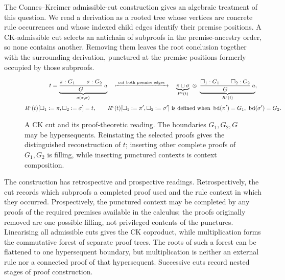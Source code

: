 \documentclass[10pt,a4paper]{article}
\theoremstyle{plain}
\theoremstyle{definition}
\theoremstyle{remark}
\newcommand{\rootseq}{\operatorname{bd}}
\newcommand{\fjoin}{\mathbin{\sqcup}}
\begin{document}
The Connes--Kreimer admissible-cut construction gives an algebraic treatment
of this question.  We read a derivation as a rooted tree whose vertices are
concrete rule occurrences and whose indexed child edges identify their
premise positions.  A CK-admissible cut selects an antichain of subproofs
in the premise-ancestry order, so none contains another.  Removing them
leaves the root conclusion together with the
surrounding derivation, punctured at the premise positions formerly occupied
by those subproofs.

\begin{figure}[H]
\centering
\[
\begin{gathered}
t=
\underbrace{
 \frac{\pi:G_1\qquad \sigma:G_2}{G}\;a
}_{a(\pi,\sigma)}
\quad\xmapsto{\ \text{cut both premise edges}\ }\quad
\underbrace{\pi\fjoin\sigma}_{P^c(t)}
\ \otimes\
\underbrace{
 \frac{\Box_1:G_1\qquad\Box_2:G_2}{G}\;a
}_{R^c(t)},\\[4pt]
R^c(t)[\Box_1:=\pi,\Box_2:=\sigma]=t,\qquad
R^c(t)[\Box_1:=\pi',\Box_2:=\sigma']
\ \text{is defined when }\rootseq(\pi')=G_1,\ \rootseq(\sigma')=G_2 .
\end{gathered}
\]
\caption{A CK cut and its proof-theoretic reading.  The boundaries
\(G_1,G_2,G\) may be hypersequents.  Reinstating the selected proofs gives
the distinguished reconstruction of \(t\); inserting other complete proofs
of \(G_1,G_2\) is filling, while inserting punctured contexts is context
composition.}
\label{fig:intro-ck-cut}
\end{figure}

The construction has retrospective and prospective readings.  Retrospectively,
the cut records which subproofs a completed proof used and the rule context
in which they occurred.  Prospectively, the punctured context may be
completed by any proofs of the required premises available in the calculus;
the proofs originally removed are one possible filling, not privileged
contents of the punctures.  Linearising all admissible cuts gives the CK
coproduct, while multiplication forms the commutative forest of separate
proof trees.  The roots of such a forest can be flattened to one
hypersequent boundary, but multiplication is neither an external rule nor a
connected proof of that hypersequent.  Successive cuts record nested stages
of proof construction.
\end{document}
